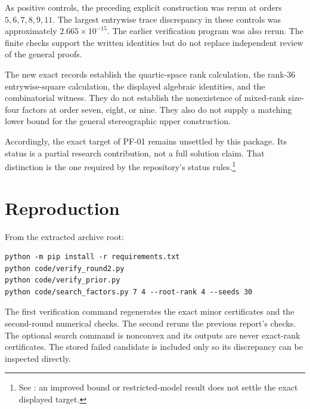 \documentclass[11pt]{article}
\theoremstyle{remark}\newtheorem{remark}[theorem]{Remark}
\begin{document}
As positive controls, the preceding explicit construction was rerun at orders $5,6,7,8,9,11$. The largest entrywise trace discrepancy in these controls was approximately $2.665\times10^{-15}$. The earlier verification program was also rerun. The finite checks support the written identities but do not replace independent review of the general proofs.

The new exact records establish the quartic-space rank calculation, the rank-36 entrywise-square calculation, the displayed algebraic identities, and the combinatorial witness. They do not establish the nonexistence of mixed-rank size-four factors at order seven, eight, or nine. They also do not supply a matching lower bound for the general stereographic upper construction.

Accordingly, the exact target of PF-01 remains unsettled by this package. Its status is a partial research contribution, not a full solution claim. That distinction is the one required by the repository's status rules.\footnote{See \cite{status}: an improved bound or restricted-model result does not settle the exact displayed target.}

\section*{Reproduction}
From the extracted archive root:
\begin{verbatim}
python -m pip install -r requirements.txt
python code/verify_round2.py
python code/verify_prior.py
python code/search_factors.py 7 4 --root-rank 4 --seeds 30
\end{verbatim}
The first verification command regenerates the exact minor certificates and the second-round numerical checks. The second reruns the previous report's checks. The optional search command is nonconvex and its outputs are never exact-rank certificates. The stored failed candidate is included only so its discrepancy can be inspected directly.
\end{document}
